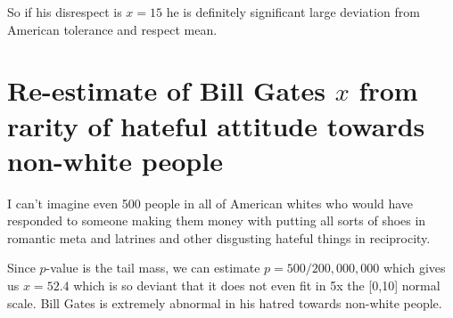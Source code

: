 \documentclass{amsart}
\begin{document}
So if his disrespect is $x=15$ he is definitely significant large deviation from American tolerance and respect mean.

\section{Re-estimate of Bill Gates $x$ from rarity of hateful attitude towards non-white people}

I can't imagine even 500 people in all of American whites who would have responded to someone making them money with putting all sorts of shoes in romantic meta and latrines and other disgusting hateful things in reciprocity.  

Since $p$-value is the tail mass, we can estimate $p = 500/200,000,000$ which gives us $x=52.4$ which is so deviant that it does not even fit in 5x the [0,10] normal scale.  Bill Gates is extremely abnormal in his hatred towards non-white people.
\end{document}
